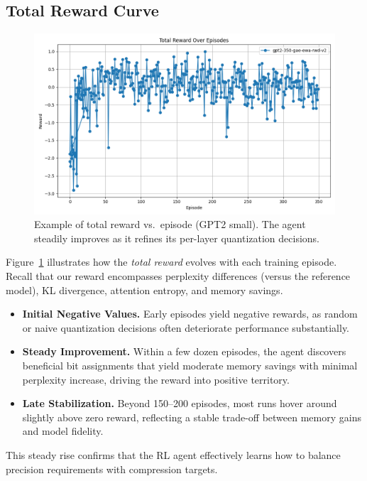\documentclass{article}
\begin{document}
	\subsection{Total Reward Curve}
	\begin{figure}[ht]
	\centering
	\includegraphics[width=\columnwidth]{gpt2-350-gae-ewa-rwd-v2-reward.png}
	\vspace{-1em}
	\caption{\small Example of total reward vs.\ episode (GPT2 small). The agent steadily improves as it refines its per-layer quantization decisions.}
	\label{fig:reward_curves}
	\vspace{-0.2em}
	\end{figure}	
	Figure~\ref{fig:reward_curves} illustrates how the \emph{total reward} evolves with each training episode. Recall that our reward encompasses perplexity differences (versus the reference model), KL divergence, attention entropy, and memory savings. 
	\begin{itemize}
		\item \textbf{Initial Negative Values.} Early episodes yield negative rewards, as random or naive quantization decisions often deteriorate performance substantially.
		\item \textbf{Steady Improvement.} Within a few dozen episodes, the agent discovers beneficial bit assignments that yield moderate memory savings with minimal perplexity increase, driving the reward into positive territory.
		\item \textbf{Late Stabilization.} Beyond 150--200 episodes, most runs hover around slightly above zero reward, reflecting a stable trade-off between memory gains and model fidelity.
	\end{itemize}
	This steady rise confirms that the RL agent effectively learns how to balance precision requirements with compression targets.
	
\end{document}
